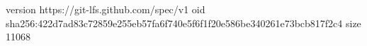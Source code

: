 version https://git-lfs.github.com/spec/v1
oid sha256:422d7ad83c72859e255eb57fa6f740e5f6f1f20e586be340261e73bcb817f2c4
size 11068
